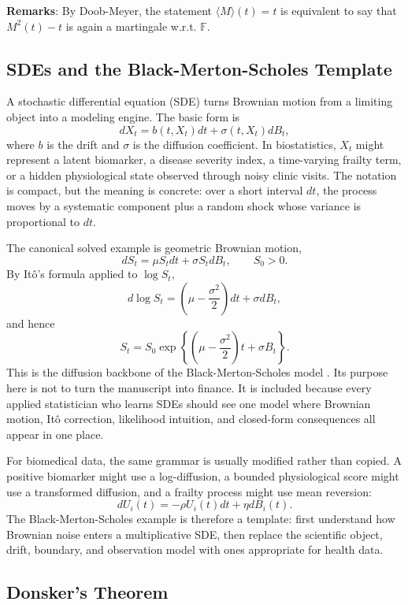 \documentclass{article}
\theoremstyle{plain}
\theoremstyle{definition}
\begin{document}
\textbf{Remarks}: By Doob-Meyer, the statement $\langle M\rangle(t) = t$ is equivalent to say that $M^2(t)-t$ is again a martingale w.r.t. $\mathbb{F}$.

\subsection{SDEs and the Black-Merton-Scholes Template}

A stochastic differential equation (SDE) turns Brownian motion from a limiting object into a modeling engine. The basic form is
\[
dX_t=b(t,X_t)dt+\sigma(t,X_t)dB_t,
\]
where \(b\) is the drift and \(\sigma\) is the diffusion coefficient. In biostatistics, \(X_t\) might represent a latent biomarker, a disease severity index, a time-varying frailty term, or a hidden physiological state observed through noisy clinic visits. The notation is compact, but the meaning is concrete: over a short interval \(dt\), the process moves by a systematic component plus a random shock whose variance is proportional to \(dt\).

The canonical solved example is geometric Brownian motion,
\[
dS_t=\mu S_tdt+\sigma S_tdB_t,\qquad S_0>0.
\]
By Itô's formula applied to \(\log S_t\),
\[
d\log S_t=\left(\mu-\frac{\sigma^2}{2}\right)dt+\sigma dB_t,
\]
and hence
\[
S_t=S_0\exp\left\{\left(\mu-\frac{\sigma^2}{2}\right)t+\sigma B_t\right\}.
\]
This is the diffusion backbone of the Black-Merton-Scholes model \citep{black1973pricing,merton1973theory}. Its purpose here is not to turn the manuscript into finance. It is included because every applied statistician who learns SDEs should see one model where Brownian motion, Itô correction, likelihood intuition, and closed-form consequences all appear in one place.

For biomedical data, the same grammar is usually modified rather than copied. A positive biomarker might use a log-diffusion, a bounded physiological score might use a transformed diffusion, and a frailty process might use mean reversion:
\[
dU_i(t)=-\rho U_i(t)dt+\eta dB_i(t).
\]
The Black-Merton-Scholes example is therefore a template: first understand how Brownian noise enters a multiplicative SDE, then replace the scientific object, drift, boundary, and observation model with ones appropriate for health data.

\subsection{Donsker's Theorem}
\end{document}
